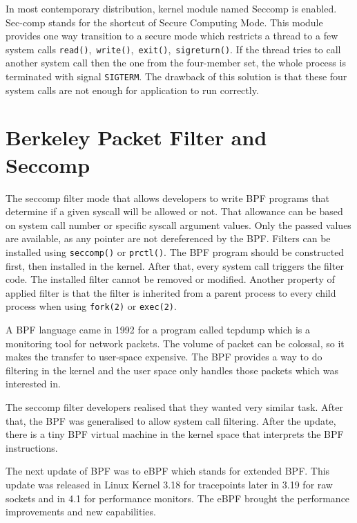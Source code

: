 In most contemporary distribution, kernel module named Seccomp\cite{seccomp_sandbox} is enabled.
Sec-comp stands for the shortcut of Secure Computing Mode.
This module provides one way transition to a secure mode which restricts a thread to a few system calls \texttt{read()},\ \texttt{write()},\ \texttt{exit()},\ \texttt{sigreturn()}.
If the thread tries to call another system call then the one from the four-member set, the whole process is terminated with signal \texttt{SIGTERM}.
The drawback of this solution is that these four system calls are not enough for application to
run correctly.


\section{Berkeley Packet Filter and Seccomp}
The seccomp filter mode that allows developers to write BPF programs that determine if a given syscall will be allowed or not.
That allowance can be based on system call number or specific syscall argument values.
Only the passed values are available, as any pointer are not dereferenced by the BPF.
Filters can be installed using \texttt{seccomp()} or \texttt{prctl()}.
The BPF program should be constructed first, then installed in the kernel.
After that, every system call triggers the filter code.
The installed filter cannot be removed or modified.
Another property of applied filter is that the filter is inherited from a parent process to every child process when using \texttt{fork(2)} or \texttt{exec(2)}.

A BPF language came in 1992 for a program called tcpdump which is a monitoring tool for network packets.
The volume of packet can be colossal, so it makes the transfer to user-space expensive.
The BPF provides a way to do filtering in the kernel and the user space only handles those packets which was interested in.

The seccomp filter developers realised that they wanted very similar task.
After that, the BPF was generalised to allow system call filtering.
After the update, there is a tiny BPF virtual machine in the kernel space that interprets the BPF instructions.

The next update of BPF was to eBPF which stands for extended BPF.
This update was released in Linux Kernel 3.18 for tracepoints later in 3.19 for raw sockets and in 4.1 for performance monitors.
The eBPF brought the performance improvements and new capabilities.

